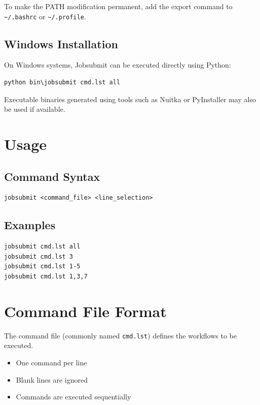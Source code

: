 \documentclass[12pt,a4paper]{article}
\begin{document}
To make the PATH modification permanent, add the export command to \texttt{\textasciitilde/.bashrc} or \texttt{\textasciitilde/.profile}.

\subsection{Windows Installation}

On Windows systems, Jobsubmit can be executed directly using Python:

\begin{lstlisting}
python bin\jobsubmit cmd.lst all
\end{lstlisting}

Executable binaries generated using tools such as Nuitka or PyInstaller may also be used if available.

\section{Usage}

\subsection{Command Syntax}

\begin{lstlisting}
jobsubmit <command_file> <line_selection>
\end{lstlisting}

\subsection{Examples}

\begin{lstlisting}
jobsubmit cmd.lst all
jobsubmit cmd.lst 3
jobsubmit cmd.lst 1-5
jobsubmit cmd.lst 1,3,7
\end{lstlisting}

\section{Command File Format}

The command file (commonly named \texttt{cmd.lst}) defines the workflows to be executed.

\begin{itemize}
    \item One command per line
    \item Blank lines are ignored
    \item Commands are executed sequentially
\end{itemize}
\end{document}
